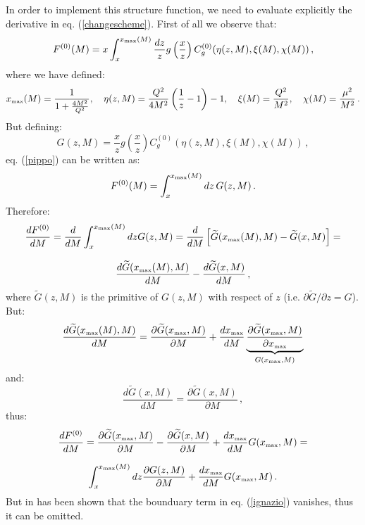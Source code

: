 \documentclass[10pt,a4paper]{article}
\begin{document}
In order to implement this structure function, we need to evaluate explicitly the derivative in eq. (\ref{changescheme}). First of all we observe that:
\begin{equation}
F^{(0)}(M) = x\int_x^{x_{\mbox{\tiny max}}(M)}
\frac{dz}{z}g\left(\frac{x}{z}\right)C_g^{(0)}(\eta(z,M),\xi(M),\chi(M))\,,
\label{pippo}
\end{equation}
where we have defined:
\begin{equation}
x_{\mbox{\tiny max}}(M)=\frac1{1+\frac{4M^2}{Q^2}},\quad\eta(z,M) = \frac{Q^2}{4M^2}\left(\frac1z-1\right)-1,\quad \xi(M) =\frac{Q^2}{M^2},\quad \chi(M) =\frac{\mu^2}{M^2}\,.
\end{equation}
But defining:
\begin{equation}
G(z,M)=\frac{x}{z}g\left(\frac{x}{z}\right)C_g^{(0)}(\eta(z,M),\xi(M),\chi(M))\,,
\end{equation}
eq. (\ref{pippo}) can be written as:
\begin{equation}
F^{(0)}(M) = \int_x^{x_{\mbox{\tiny max}}(M)} dz\,G(z,M)\,.
\end{equation}
Therefore:
\begin{equation}
\begin{array}{c}
\displaystyle \frac{dF^{(0)}}{dM} = \frac{d}{dM}\int_x^{x_{\mbox{\tiny max}}(M)} dzG(z,M) = \frac{d}{dM}\left[\widetilde{G}(x_{\mbox{\tiny max}}(M),M)-\widetilde{G}(x,M)\right]=\\
\\
\displaystyle \frac{d\widetilde{G}(x_{\mbox{\tiny max}}(M),M)}{dM}-\frac{d\widetilde{G}(x,M)}{dM}\,,
\end{array}
\end{equation}
where $\widetilde{G}(z,M)$ is the primitive of $G(z,M)$ with respect of $z$ (i.e. $\partial\widetilde{G}/\partial z = G$). But:
\begin{equation}
\frac{d\widetilde{G}(x_{\mbox{\tiny max}}(M),M)}{dM} = \frac{\partial \widetilde{G}(x_{\mbox{\tiny max}},M)}{\partial M}+\frac{dx_{\mbox{\tiny max}}}{dM}\underbrace{\frac{\partial \widetilde{G}(x_{\mbox{\tiny max}},M)}{\partial x_{\mbox{\tiny max}}}}_{G(x_{\mbox{\tiny max}},M)}
\end{equation}
and:
\begin{equation}
\frac{d \widetilde{G}(x,M)}{d M}=\frac{\partial\widetilde{G}(x,M)}{\partial M}\,,
\end{equation}
thus:
\begin{equation}
\begin{array}{c}
\displaystyle \frac{dF^{(0)}}{dM} = \frac{\partial \widetilde{G}(x_{\mbox{\tiny max}},M)}{\partial M}-\frac{\partial\widetilde{G}(x,M)}{\partial M}+\frac{dx_{\mbox{\tiny max}}}{dM}G(x_{\mbox{\tiny max}},M) =\\
\\
\displaystyle \int_x^{x_{\mbox{\tiny max}}(M)} dz\frac{\partial G(z,M)}{\partial M}+\frac{dx_{\mbox{\tiny max}}}{dM}G(x_{\mbox{\tiny max}},M)\,.
\end{array}
\label{ignazio}
\end{equation}
But in \cite{Alekhin:2010sv} has been shown that the bounduary term in eq. (\ref{ignazio}) vanishes, thus it can be omitted.
\end{document}
